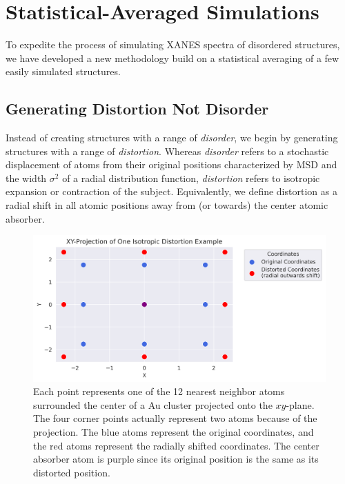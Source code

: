 \section{Statistical-Averaged Simulations}
To expedite the process of simulating XANES spectra of disordered structures, we have developed a new methodology build on a statistical averaging of a few easily simulated structures.

\subsection{Generating Distortion Not Disorder} \label{sec:start-disorder}
Instead of creating structures with a range of \textit{disorder}, we begin by generating structures with a range of \textit{distortion}. Whereas \textit{disorder} refers to a stochastic displacement of atoms from their original positions characterized by MSD and the width $ \sigma^2 $ of a radial distribution function, \textit{distortion} refers to isotropic expansion or contraction of the subject. Equivalently, we define distortion as a radial shift in all atomic positions away from (or towards) the center atomic absorber.

\begin{figure}[h]
	\centering
	\includegraphics[width=\linewidth]{Chapters/Figures/2d_distortion_example.png}
	\caption[2D Distortion]{Each point represents one of the 12 nearest neighbor atoms surrounded the center of a Au cluster projected onto the $xy$\nobreakdash-plane. The four corner points actually represent two atoms because of the projection. The blue atoms represent the original coordinates, and the red atoms represent the radially shifted coordinates. The center absorber atom is purple since its original position is the same as its distorted position.}
	\label{fig:2d-distortion}
\end{figure}

